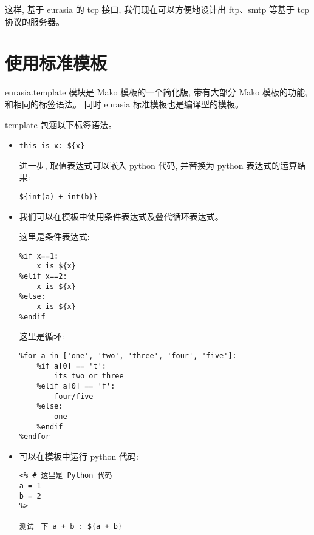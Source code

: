 \documentclass{manual}
\begin{document}
这样, 基于 eurasia 的 tcp 接口, 我们现在可以方便地设计出 ftp、smtp 等基于 tcp 协议的服务器。

\section{使用标准模板}

eurasia.template 模块是 Mako 模板的一个简化版, 带有大部分 Mako 模板的功能, 和相同的标签语法。
同时 eurasia 标准模板也是编译型的模板。

template 包涵以下标签语法。

\begin{itemize}

\item {}

\begin{verbatim}
this is x: ${x}
\end{verbatim}

进一步, 取值表达式可以嵌入 python 代码, 并替换为 python 表达式的运算结果:

\begin{verbatim}
${int(a) + int(b)}
\end{verbatim}

\item {}

我们可以在模板中使用条件表达式及叠代循环表达式。

这里是条件表达式:

\begin{verbatim}
%if x==1:
	x is ${x}
%elif x==2:
	x is ${x}
%else:
	x is ${x}
%endif
\end{verbatim}

这里是循环:

\begin{verbatim}
%for a in ['one', 'two', 'three', 'four', 'five']:
	%if a[0] == 't':
		its two or three
	%elif a[0] == 'f':
		four/five
	%else:
		one
	%endif
%endfor
\end{verbatim}

\item {}

可以在模板中运行 python 代码:

\begin{verbatim}
<% # 这里是 Python 代码
a = 1
b = 2
%>

测试一下 a + b : ${a + b}
\end{verbatim}



\end{itemize}
\end{document}
